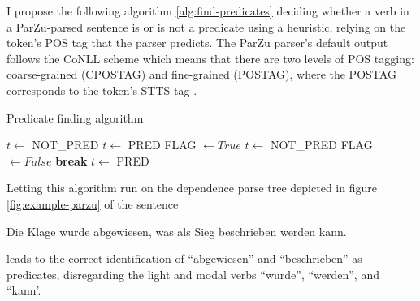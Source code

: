 
I propose the following algorithm \ref{alg:find-predicates} deciding whether a verb in a
ParZu-parsed sentence is or is not a predicate using a heuristic, relying on the token's
POS tag that the parser predicts. The ParZu parser's default output follows the CoNLL
scheme \citep{buchholz2006conll} which means that there are two levels of POS tagging:
coarse-grained (CPOSTAG) and fine-grained (POSTAG), where the POSTAG corresponds to the
token's STTS tag \citep{schiller1999guidelines}.

\begin{algorithm}
\caption{Predicate finding algorithm}
\label{alg:find-predicates}
	\begin{algorithmic}[1]
			\STATE $t \leftarrow$ NOT\_PRED
		\ELSE
				\STATE $t \leftarrow$ PRED
			\ELSE
				\STATE FLAG $\leftarrow True$
						\STATE $t \leftarrow$ NOT\_PRED
						\STATE FLAG $\leftarrow False$
						\STATE \textbf{break}
					\ENDIF
				\ENDFOR
				\IF{FLAG $= True$}
					\STATE $t \leftarrow$ PRED
				\ENDIF
			\ENDIF
		\ENDIF
	\ENDFOR
\end{algorithmic}
\end{algorithm}


Letting this algorithm run on the dependence parse tree depicted in figure \ref{fig:example-parzu}
of the sentence

\begin{examples}
	\item \label{ex:multiple-predicates} Die Klage wurde abgewiesen, was als Sieg beschrieben werden kann.
\end{examples}

leads to the correct identification of ``abgewiesen'' and ``beschrieben'' as predicates,
disregarding the light and modal verbs ``wurde'', ``werden'', and ``kann'.


